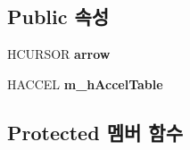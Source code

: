\subsection*{Public 속성}
\begin{DoxyCompactItemize}
\item 
\mbox{\label{class_main_wnd_aacb2a400730b1e95ee16792acd6a089f}} 
H\+C\+U\+R\+S\+OR {\bfseries arrow}
\item 
\mbox{\label{class_main_wnd_adde0f53e1d63ef457254bfb346e48152}} 
H\+A\+C\+C\+EL {\bfseries m\+\_\+h\+Accel\+Table}
\end{DoxyCompactItemize}
\subsection*{Protected 멤버 함수}
